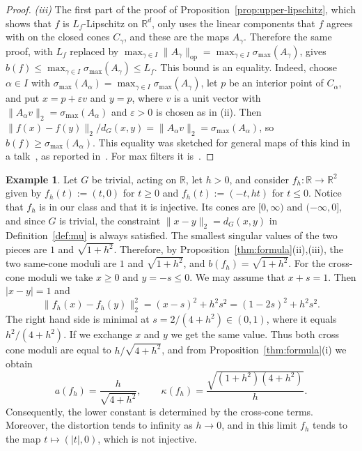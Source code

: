\documentclass[11pt]{article}
\newcommand{\R}{\mathbb{R}}
\theoremstyle{definition}
\newtheorem{ex}[theor]{Example}
\begin{document}
\begin{proof}
	\emph{(iii)} The first part of the proof of Proposition~\ref{prop:upper-lipschitz},
	which shows that $f$ is $L_f$-Lipschitz on $\R^d$, only uses the linear components that
	$f$ agrees with on the closed cones $C_{\gamma}$, and these are the maps $A_{\gamma}$. Therefore the same proof, with $L_f$ replaced by
	$\max_{\gamma\in I}\|A_{\gamma}\|_{\operatorname{op}}=\max_{\gamma\in I}\sigma_{\max}(A_{\gamma})$,
	gives $b(f)\le\max_{\gamma\in I}\sigma_{\max}(A_{\gamma})\leq L_f$. This bound is an equality. Indeed, choose $\alpha\in I$ with
	$\sigma_{\max}(A_\alpha)=\max_{\gamma\in I}\sigma_{\max}(A_\gamma)$, let $p$ be an interior
	point of $C_{\alpha}$, and put $x=p+\varepsilon v$ and $y=p$, where $v$ is a unit vector
	with $\|A_{\alpha}v\|_2=\sigma_{\max}(A_{\alpha})$ and $\varepsilon>0$ is chosen as in (ii).
	Then $\|f(x)-f(y)\|_2/d_{G}(x,y)=\|A_{\alpha}v\|_2=\sigma_{\max}(A_{\alpha})$, so
	$b(f)\ge\sigma_{\max}(A_{\alpha})$. This equality
	was sketched for general maps of this kind in a talk~\cite{ghoreishi2024maxfilter}, as reported
	in~\cite[Sec.~3.1]{mixonqaddura}. For max filters it is~\cite[Thm.~14]{mixonqaddura}.
\end{proof}

\begin{ex}\label{ex:two-piece}
	Let $G$ be trivial, acting on $\R$, let $h>0$, and consider $f_h\colon\R\to\R^2$ given by
	$f_h(t):=(t,0)$ for $t\ge0$ and $f_h(t):=(-t,ht)$ for $t\le0$. Notice that $f_h$ is in our
	class and that it is injective. Its cones are $[0,\infty)$ and $(-\infty,0]$, and since $G$ is
	trivial, the constraint $\|x-y\|_2=d_G(x,y)$ in Definition~\ref{def:mu} is always satisfied.
	The smallest singular values of the two pieces are $1$ and $\sqrt{1+h^2}$. Therefore, by
	Proposition~\ref{thm:formula}(ii),(iii), the two same-cone moduli are $1$ and
	$\sqrt{1+h^2}$, and $b(f_h)=\sqrt{1+h^2}$. For the cross-cone moduli we take $x\ge0$ and
	$y=-s\le0$. We may assume that
	$x+s=1$. Then $|x-y|=1$ and
	\[
	\|f_h(x)-f_h(y)\|_2^2=(x-s)^2+h^2s^2=(1-2s)^2+h^2s^2 .
	\]
	The right hand side is minimal at $s=2/(4+h^2)\in(0,1)$, where it equals $h^2/(4+h^2)$.
	If we exchange  $x$ and $y$ we get the same value. Thus both cross cone moduli
	are equal to $h/\sqrt{4+h^2}$, and from Proposition~\ref{thm:formula}(i) we obtain
	\[
	a(f_h)=\frac{h}{\sqrt{4+h^2}},\qquad
	\kappa(f_h)=\frac{\sqrt{(1+h^2)(4+h^2)}}{h}.
	\]
	Consequently, the lower constant is determined by the cross-cone terms. Moreover, the
	distortion tends to infinity as $h\to0$, and in this limit $f_h$ tends to the map
	$t\mapsto(|t|,0)$, which is not injective.
\end{ex}
\end{document}
